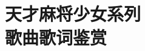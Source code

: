 
\part[天麻歌赏]{{\rm\sffamily\hei 天才麻将少女系列\\歌曲歌词鉴赏}}
\setcounter{chapter}{0}

\renewcommand{\B}[1]{{\bfseries{#1}}}

\newcommand{\album}[1]{\def\albumName{#1}\addcontentsline{toc}{chapter}{\shingo #1}}
\newcommand{\songTitle}[2]{\clearpage\addcontentsline{toc}{section}{\mincho #1}{\Large\maru\B{#1}\quad{\rm\small\outai #2}}\par}
\newcommand{\songTitled}[3]{\clearpage\addcontentsline{toc}{section}{\mincho #1}
{\rm\tiny\mincho{#3}}\par
{\Large\maru\B{#1}\quad{\rm\small\outai #2}}\par}
\newcommand{\songMemo}[1]{{\rm\small\tsuku{#1}}\par}
\newcommand{\songText}[1]{\begin{multicols}{2}{#1}\end{multicols}}
\newcommand{\songTexts}[2]{\begin{multicols}{#1}{#2}\end{multicols}}
\newcommand{\newcolumn}{\vfill\null
\columnbreak}

\CTEXnoindent


% 
% 

% 
% 

% 
% 
